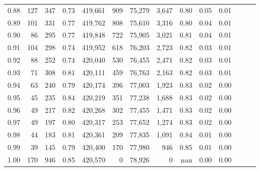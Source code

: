\begin{tabular}{rrrrrrrrrrrrrr}
0.88 &     127 &    347 &  0.73 &  419,661 &      909 &  75,279 &   3,647 &  0.80 &  0.05 &      0.01 \\
0.89 &     101 &    331 &  0.77 &  419,762 &      808 &  75,610 &   3,316 &  0.80 &  0.04 &      0.01 \\
0.90 &      86 &    295 &  0.77 &  419,848 &      722 &  75,905 &   3,021 &  0.81 &  0.04 &      0.01 \\
0.91 &     104 &    298 &  0.74 &  419,952 &      618 &  76,203 &   2,723 &  0.82 &  0.03 &      0.01 \\
0.92 &      88 &    252 &  0.74 &  420,040 &      530 &  76,455 &   2,471 &  0.82 &  0.03 &      0.01 \\
0.93 &      71 &    308 &  0.81 &  420,111 &      459 &  76,763 &   2,163 &  0.82 &  0.03 &      0.01 \\
0.94 &      63 &    240 &  0.79 &  420,174 &      396 &  77,003 &   1,923 &  0.83 &  0.02 &      0.00 \\
0.95 &      45 &    235 &  0.84 &  420,219 &      351 &  77,238 &   1,688 &  0.83 &  0.02 &      0.00 \\
0.96 &      49 &    217 &  0.82 &  420,268 &      302 &  77,455 &   1,471 &  0.83 &  0.02 &      0.00 \\
0.97 &      49 &    197 &  0.80 &  420,317 &      253 &  77,652 &   1,274 &  0.83 &  0.02 &      0.00 \\
0.98 &      44 &    183 &  0.81 &  420,361 &      209 &  77,835 &   1,091 &  0.84 &  0.01 &      0.00 \\
0.99 &      39 &    145 &  0.79 &  420,400 &      170 &  77,980 &     946 &  0.85 &  0.01 &      0.00 \\
1.00 &     170 &    946 &  0.85 &  420,570 &        0 &  78,926 &       0 &   nan &  0.00 &      0.00 \\
\bottomrule
\end{tabular}
